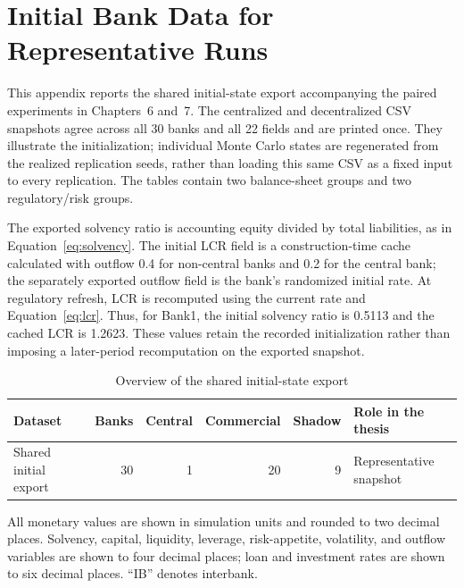 \chapter{Initial Bank Data for Representative Runs}
\label{app:initial-bank-data}
\label{app:policy-event-logs}

This appendix reports the shared initial-state export accompanying the
paired experiments in Chapters~6 and~7. The centralized and decentralized
CSV snapshots agree across all 30 banks and all 22 fields and are printed
once. They illustrate the initialization; individual Monte Carlo states
are regenerated from the realized replication seeds, rather than loading
this same CSV as a fixed input to every replication. The tables contain
two balance-sheet groups and two regulatory/risk groups.

The exported solvency ratio is accounting equity divided by total
liabilities, as in Equation~\eqref{eq:solvency}. The initial LCR field is
a construction-time cache calculated with outflow 0.4 for non-central
banks and 0.2 for the central bank; the separately exported outflow field
is the bank's randomized initial rate. At regulatory refresh, LCR is
recomputed using the current rate and Equation~\eqref{eq:lcr}. Thus, for
Bank1, the initial solvency ratio is 0.5113 and the cached LCR is 1.2623.
These values retain the recorded initialization rather than imposing a
later-period recomputation on the exported snapshot.

\begin{table}[htbp]
\centering
\caption{Overview of the shared initial-state export}
\label{tab:initial-bank-data-overview}
\small
\begin{tabular}{lrrrrl}
\toprule
Dataset & Banks & Central & Commercial & Shadow & Role in the thesis \\
\midrule
Shared initial export & 30 & 1 & 20 & 9 & Representative snapshot \\
\bottomrule
\end{tabular}
\end{table}

All monetary values are shown in simulation units and rounded to two
decimal places. Solvency, capital, liquidity, leverage, risk-appetite,
volatility, and outflow variables are shown to four decimal places; loan
and investment rates are shown to six decimal places. ``IB'' denotes
interbank.

\begingroup
\small
\setlength{\tabcolsep}{5pt}
\renewcommand{\arraystretch}{1.12}

